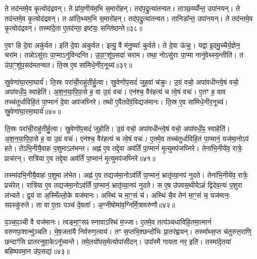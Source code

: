 ते तद॑न्तमे॒व कृ॒त्वोद॑द्रवन्।
ते प्रा॑य॒णीय॑म॒भि स॒मारो॑हन्।
तद॑प॒द्रुत्या॑\-तन्वत।
ताञ्छ॒य्य्वँ॑न्त॒ उपा॑नयन्।
ते तद॑न्तमे॒व कृ॒त्वोद॑द्रवन्।
त आ॑ति॒थ्यम॒भि स॒मारो॑हन्।
तद॑प॒द्रुत्या॑\-तन्वत।
तानिडा᳚न्त॒ उपा॑नयन्।
ते तद॑न्तमे॒व कृ॒त्वोद॑द्रवन्।
तस्मा॑दे॒ता ए॒तद॑न्ता॒ इष्ट॑यः॒ सन्ति॑ष्ठन्ते॥३८॥\ip

ए॒वꣳ हि दे॒वा अकु॑र्वत।
इति॑ दे॒वा अ॑कुर्वत।
इत्यु॒ वै म॑नु॒ष्याः᳚ कुर्वते।
ते दे॒वा ऊ॑चुः।
यद्वा इ॒दमु॒च्चैर्य॒ज्ञेन॒ चरा॑म।
तन्नो\-ऽसु॑राः पा॒प्मा\-ऽनु॑विन्दन्ति।
उ॒पा॒ꣳ॒शू॑प॒सदा॑ चराम।
तथा॒ नोऽसु॑राः पा॒प्मा नानु॑वेथ्स्य॒न्तीति॑।
त उ॑पा॒ꣳ॒शू॑प॒सद॑मतन्वत।
ति॒स्र ए॒व सा॑मिधे॒नीर॒नूच्य॑॥३९॥\ip

स्रु॒वेणा॑घा॒रमा॒घार्य॑।
ति॒स्रः परा॑ची॒राहु॑तीर्\mbox{}हु॒त्वा।
स्रु॒वेणो॑प॒सदं॑ जुह॒वां च॑क्रुः।
उ॒ग्रं वचो॒ अपा॑वधीन्त्वे॒षं वचो॒ अपा॑वधी॒ꣴ॒ स्वाहेति॑।
अ॒श॒न॒या॒पि॒पा॒से ह॒ वा उ॒ग्रं वचः॑।
एन॑श्च॒ वैर॑हत्यं च त्वे॒षं वचः॑।
ए॒तꣳ ह॒ वाव तच्च॑तुर्धाविहि॒तं पा॒प्मानं॑ दे॒वा अप॑जघ्निरे।
तथो॑ ए॒वैतदे॑वं॒विद्यज॑मानः।
ति॒स्र ए॒व सा॑मिधे॒नीर॒नूच्य॑।
स्रु॒वेणा॑घा॒रमा॒घार्य॑॥४०॥\ip

ति॒स्रः परा॑ची॒राहु॑तीर्\mbox{}हु॒त्वा।
स्रु॒वेणो॑प॒सदं॑ जुहोति।
उ॒ग्रं वचो॒ अपा॑वधीन्त्वे॒षं वचो॒ अपा॑वधी॒ꣴ॒ स्वाहेति॑।
अ॒श॒न॒या॒पि॒पा॒से ह॒ वा उ॒ग्रं वचः॑।
एन॑श्च॒ वैर॑हत्यं च त्वे॒षं वचः॑।
ए॒तमे॒व तच्च॑तुर्धाविहि॒तं पा॒प्मानं॒ यज॑मा॒नोऽप॑ हते।
ते॑ऽभि॒नीयै॒वाहः॑ प॒शुमा\-ऽल॑भन्त।
अह्न॑ ए॒व तद्दे॒वा अव॑र्तिं पा॒प्मानं॑ मृ॒त्युमप॑जघ्निरे।
तेना॑भि॒नीये॑व॒ रात्रेः॒ प्राच॑रन्।
रात्रि॑या ए॒व तद्दे॒वा अव॑र्तिं पा॒प्मानं॑ मृ॒त्युमप॑जघ्निरे॥४१॥\ip

तस्मा॑दभि॒नीयै॒वाहः॑ प॒शुमा ल॑भेत।
अह्न॑ ए॒व तद्यज॑मा॒नो\-ऽव॑र्तिं पा॒प्मानं॒ भ्रातृ॑व्या॒नप॑ नुदते।
तेना॑भि॒नीये॑व॒ रात्रेः॒ प्रच॑रेत्।
रात्रि॑या ए॒व तद्यज॑मा॒नो\-ऽव॑र्तिं पा॒प्मानं॒ भ्रातृ॑व्या॒नप॑ नुदते।
स ए॒ष उ॑पवस॒थीयेऽहं॑ द्विदेव॒त्यः॑ प॒शुरा ल॑भ्यते।
द्व॒यं वा अ॒स्मिँल्लो॒के यज॑मानः।
अस्थि॑ च मा॒ꣳ॒सं च॑।
अस्थि॑ चै॒व तेन॑ मा॒ꣳ॒सं च॒ यज॑मानः॒ सꣴस्कु॑रुते।
ता वा ए॒ताः पञ्च॑ दे॒वताः᳚।
अ॒ग्नीषोमा॑व॒ग्निर्मि॒त्रावरु॑णौ॥४२॥\ip

प॒ञ्च॒प॒ञ्ची वै यज॑मानः।
त्वङ्मा॒ꣳ॒सꣴ स्नावा\-ऽस्थि॑ म॒ज्जा।
ए॒तमे॒व तत्प॑ञ्चधाविहि॒तमा॒त्मानं॑ वरुणपा॒शान्मु॑ञ्चति।
भे॒ष॒जता॑यै निर्वरुण॒त्वाय॑।
तꣳ स॒प्तभि॒श्छन्दो॑भिः प्रा॒तर॑ह्वयन्।
तस्मा᳚थ्स॒प्त च॑तुरुत्त॒राणि॒ छन्दाꣳ॑सि प्रातरनु\-वा॒के\-ऽनू᳚च्यन्ते।
तमे॒तयो॑पस॒मेत्योपा॑सीदन्।
उपा᳚स्मै गायता नर॒ इति॑।
तस्मा॑दे॒तया॑ बहिष्पवमा॒न उ॑प॒सद्यः॑॥४३॥\ip\anuvakamend[ऐ॒च्छ॒न्न॒न॒य॒ꣴ॒स्ति॒ष्ठ॒न्ते॒\-ऽनूच्या॒नूच्य॑ स्रु॒वेणा॑घा॒रमा॒घार्य॒ रात्रि॑या ए॒व तद्दे॒वा अव॑र्तिं पा॒प्मानं॑ मृ॒त्युमप॑जघ्निरे मि॒त्रावरु॑णौ॒ नव॑ च (दे॒वा यज॑मानो दे॒वा दे॒वा यज॑मानो॒ यज॑मानः॒ प्राच॑रं॒ प्रच॑रे॒दाल॑भ॒न्ताल॑भेत मृ॒त्युमप॑जघ्निरे॒ भ्रातृ॑व्यान्॥)]

